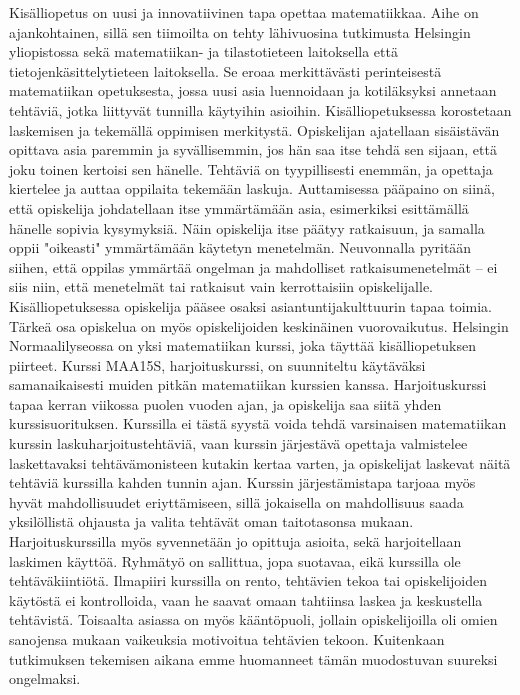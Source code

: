 Kisälliopetus on uusi ja innovatiivinen tapa opettaa matematiikkaa. Aihe on ajankohtainen, sillä sen tiimoilta on tehty lähivuosina tutkimusta Helsingin yliopistossa sekä matematiikan- ja tilastotieteen laitoksella että tietojenkäsittelytieteen laitoksella.
Se eroaa merkittävästi perinteisestä matematiikan opetuksesta, jossa uusi asia luennoidaan ja kotiläksyksi annetaan tehtäviä, jotka liittyvät tunnilla käytyihin asioihin.
Kisälliopetuksessa korostetaan laskemisen ja tekemällä oppimisen merkitystä. Opiskelijan ajatellaan sisäistävän opittava asia paremmin ja syvällisemmin, jos hän saa itse tehdä sen sijaan, että joku toinen kertoisi sen hänelle.
Tehtäviä on tyypillisesti enemmän, ja opettaja kiertelee ja auttaa oppilaita tekemään laskuja. Auttamisessa pääpaino on siinä, että opiskelija johdatellaan itse ymmärtämään asia, esimerkiksi esittämällä hänelle sopivia kysymyksiä. Näin opiskelija itse päätyy ratkaisuun, ja samalla oppii "oikeasti" ymmärtämään käytetyn menetelmän.
Neuvonnalla pyritään siihen, että oppilas ymmärtää ongelman ja mahdolliset ratkaisumenetelmät -- ei siis niin, että menetelmät tai ratkaisut vain kerrottaisiin opiskelijalle.
Kisälli\-opetuksessa opiskelija pääsee osaksi asiantuntijakulttuurin tapaa toimia.\cite{hautala2012extreme,vihavainen2011extreme}
Tärkeä osa opiskelua on myös opiskelijoiden keskinäinen vuorovaikutus. 
Helsingin Normaalilyseossa on yksi matematiikan kurssi, joka täyttää kisälli\-opetuksen piirteet.
Kurssi MAA15S, harjoituskurssi, on suunniteltu käytäväksi samanaikaisesti muiden pitkän matematiikan kurssien kanssa. 
Harjoituskurssi tapaa kerran viikossa puolen vuoden ajan, ja opiskelija saa siitä yhden kurssisuorituksen.
Kurssilla ei tästä syystä voida tehdä varsinaisen matematiikan kurssin laskuharjoitustehtäviä, vaan kurssin järjestävä opettaja valmistelee laskettavaksi tehtävämonisteen kutakin kertaa varten, ja opiskelijat laskevat näitä tehtäviä kurssilla kahden tunnin ajan.
Kurssin järjestämistapa tarjoaa myös hyvät mahdollisuudet eriyttämiseen, sillä jokaisella on mahdollisuus saada yksilöllistä ohjausta ja valita tehtävät oman taitotasonsa mukaan.
Harjoituskurssilla myös syvennetään jo opittuja asioita, sekä harjoitellaan laskimen käyttöä.
Ryhmätyö on sallittua, jopa suotavaa, eikä kurssilla ole tehtäväkiintiötä. 
Ilmapiiri kurssilla on rento, tehtävien tekoa tai opiskelijoiden käytöstä ei kontrolloida, vaan he saavat omaan tahtiinsa laskea ja keskustella tehtävistä.
Toisaalta asiassa on myös kääntöpuoli, jollain opiskelijoilla oli omien sanojensa mukaan vaikeuksia motivoitua tehtävien tekoon. Kuitenkaan tutkimuksen tekemisen aikana emme huomanneet tämän muodostuvan suureksi ongelmaksi.
